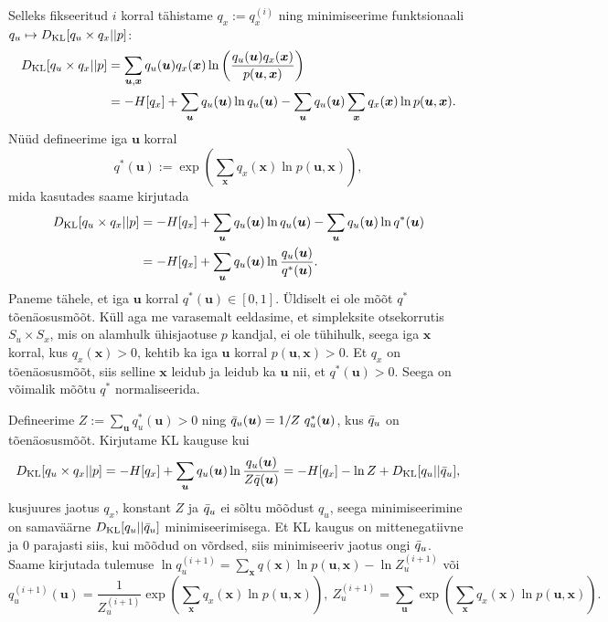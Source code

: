 Selleks fikseeritud $i$ korral tähistame $q_x := q_x^{(i)}$ ning minimiseerime funktsionaali $q_u \mapsto D_{\mathrm{KL}}[q_u \times q_x || p]$:
\begin{align*}
     D_{\mathrm{KL}}[q_u \times q_x || p] &= \sum_{\bm{u},\bm{x}} q_u(\bm{u}) q_x(\bm{x}) \ln\left( \frac{q_u(\bm{u}) q_x(\bm{x})}{p(\bm{u},\bm{x})} \right) \\
     &= -H[q_x] + \sum_{\bm{u}}q_u(\bm{u}) \ln q_u(\bm{u}) - \sum_{\bm{u}}q_u(\bm{u})\sum_{\bm{x}}q_x(\bm{x})  \ln p(\bm{u},\bm{x}).
\end{align*}
Nüüd defineerime iga $\bm{u}$ korral
$$q^*(\bm{u}) := \exp \left( \sum_{\bm{x}} q_x(\bm{x}) \ln p(\bm{u},\bm{x}) \right),$$
mida kasutades saame kirjutada
\begin{align*}
D_{\mathrm{KL}}[q_u \times q_x || p] &=
-H[q_x] + \sum_{\bm{u}}q_u(\bm{u}) \ln q_u(\bm{u}) - \sum_{\bm{u}}q_u(\bm{u}) \ln q^*(\bm{u})
\\&=
-H[q_x] + \sum_{\bm{u}}q_u(\bm{u}) \ln \frac{q_u(\bm{u})}{q^*(\bm{u})}.
\end{align*}
Paneme tähele, et iga $\bm{u}$ korral $q^*(\bm{u}) \in [0,1]$. Üldiselt ei ole mõõt $q^*$ tõenäosusmõõt. Küll aga me varasemalt eeldasime, et simpleksite otsekorrutis $S_u \times S_x$, mis on alamhulk ühisjaotuse $p$ kandjal, ei ole tühihulk, seega iga $\bm{x}$ korral, kus $q_x(\bm{x}) > 0$, kehtib ka iga $\bm{u}$ korral $p(\bm{u}, \bm{x}) > 0$. Et $q_x$ on tõenäosusmõõt, siis selline $\bm{x}$ leidub ja leidub ka $\bm{u}$ nii, et $q^*(\bm{u}) > 0$. Seega on võimalik mõõtu $q^*$ normaliseerida.

Defineerime $Z := \sum_{\bm{u}}q_u^*(\bm{u}) > 0$ ning $\Bar{q}_u(\bm{u}) = 1/Z \ q^*_u(\bm{u})$, kus $\Bar{q}_u$ on tõenäosusmõõt. Kirjutame KL kauguse kui
$$D_{\mathrm{KL}}[q_u \times q_x || p] = -H[q_x] + \sum_{\bm{u}} q_u(\bm{u}) \ln \frac{q_u(\bm{u})}{Z \Bar{q}(\bm{u})} = -H[q_x] - \ln Z + D_{\mathrm{KL}}[q_u || \Bar{q}_u],$$
kusjuures jaotus $q_x$, konstant $Z$ ja $\Bar{q}_u$ ei sõltu mõõdust $q_u$, seega minimiseerimine on samaväärne $D_{\mathrm{KL}}[q_u || \Bar{q}_u]$ minimiseerimisega. Et KL kaugus on mittenegatiivne ja $0$ parajasti siis, kui mõõdud on võrdsed, siis minimiseeriv jaotus ongi $\Bar{q}_u$. Saame kirjutada tulemuse
$\ln q_u^{(i+1)} = \sum_{\bm{x}}q(\bm{x}) \ln p(\bm{u},\bm{x}) - \ln Z_u^{(i+1)}$ või
\begin{equation}
    \label{eq:general_update}
    q^{(i+1)}_u(\bm{u}) = \frac{1}{Z_u^{(i+1)}} \exp \left( \sum_{\bm{x}} q_x(\bm{x}) \ln p(\bm{u},\bm{x}) \right),\ Z_u^{(i+1)} = \sum_{\bm{u}}\exp \left( \sum_{\bm{x}} q_x(\bm{x}) \ln p(\bm{u},\bm{x}) \right).
\end{equation}

